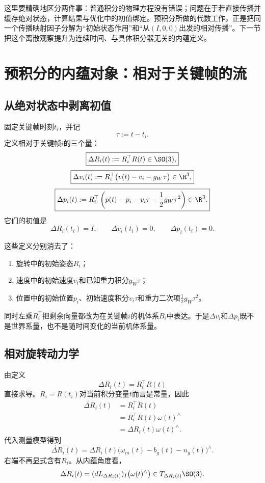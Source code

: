 这里要精确地区分两件事：普通积分的物理方程没有错误；问题在于若直接传播并缓存绝对状态，计算结果与优化中的初值绑定。预积分所做的代数工作，正是把同一个传播映射因子分解为“初始状态作用”和“从$(I,0,0)$出发的相对传播”。下一节把这个离散观察提升为连续时间、与具体积分器无关的内蕴定义。


\section{预积分的内蕴对象：相对于关键帧的流}

\subsection{从绝对状态中剥离初值}

固定关键帧时刻$t_i$，并记
\[
    \tau:=t-t_i.
\]
定义相对于关键帧$i$的三个量：
\[
\boxed{
    \Delta R_i(t):=R_i^\top R(t)\in\SO(3),
}
\]
\[
\boxed{
    \Delta v_i(t)
    :=R_i^\top\bigl(v(t)-v_i-g_W\tau\bigr)
    \in\R^3,
}
\]
\[
\boxed{
    \Delta p_i(t)
    :=R_i^\top
    \left(
        p(t)-p_i-v_i\tau-\frac12g_W\tau^2
    \right)
    \in\R^3.
}
\]
它们的初值是
\[
    \Delta R_i(t_i)=I,
    \qquad
    \Delta v_i(t_i)=0,
    \qquad
    \Delta p_i(t_i)=0.
\]

这些定义分别消去了：
\begin{enumerate}
    \item 旋转中的初始姿态$R_i$；
    \item 速度中的初始速度$v_i$和已知重力积分$g_W\tau$；
    \item 位置中的初始位置$p_i$、初始速度积分$v_i\tau$和重力二次项$\frac12g_W\tau^2$。
\end{enumerate}
同时左乘$R_i^\top$把剩余向量都改为在关键帧$i$的机体系$B_i$中表达。于是$\Delta v_i$和$\Delta p_i$既不是世界系量，也不是随时间变化的当前机体系量。

\subsection{相对旋转动力学}

由定义
\[
    \Delta R_i(t)=R_i^\top R(t)
\]
直接求导。$R_i=R(t_i)$对当前积分变量$t$而言是常量，因此
\[
\begin{aligned}
    \dot{\Delta R}_i(t)
    &=R_i^\top\dot R(t)\\
    &=R_i^\top R(t)\omega(t)^\wedge\\
    &=\Delta R_i(t)\omega(t)^\wedge.
\end{aligned}
\]
代入测量模型得到
\[
\boxed{
    \dot{\Delta R}_i(t)
    =\Delta R_i(t)
    \bigl(\omega_m(t)-b_g(t)-n_g(t)\bigr)^\wedge.
}
\]
右端不再显式含有$R_i$。从内蕴角度看，
\[
    \dot{\Delta R}_i(t)
    =(dL_{\Delta R_i(t)})_I
    \bigl(\omega(t)^\wedge\bigr)
    \in T_{\Delta R_i(t)}\SO(3).
\]


